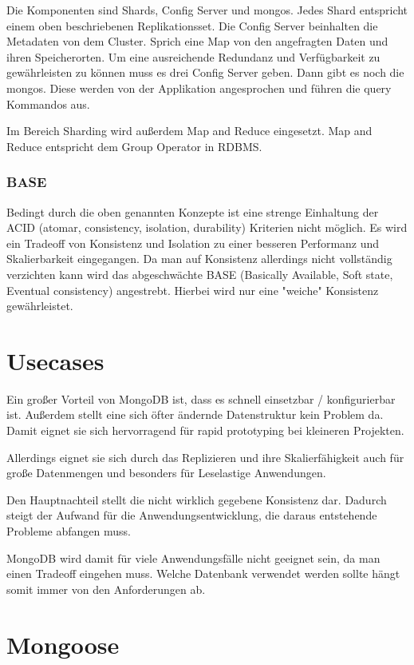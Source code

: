 Die Komponenten sind Shards, Config Server und mongos. Jedes Shard entspricht einem oben
beschriebenen Replikationsset. Die Config Server beinhalten die
Metadaten von dem Cluster. Sprich eine Map von den angefragten Daten und
ihren Speicherorten. Um eine ausreichende Redundanz und Verfügbarkeit zu gewährleisten zu können
muss es drei Config Server geben. Dann gibt es noch die mongos. Diese
werden von der Applikation angesprochen und führen die query Kommandos
aus.

Im Bereich Sharding wird außerdem Map and Reduce eingesetzt. Map and Reduce entspricht dem Group Operator in RDBMS.

\subsubsection{BASE}
Bedingt durch die oben genannten Konzepte ist eine strenge Einhaltung der ACID (atomar, consistency, isolation, durability) Kriterien nicht möglich. Es wird ein Tradeoff von Konsistenz und Isolation zu einer besseren Performanz und Skalierbarkeit eingegangen. Da man auf Konsistenz allerdings nicht vollständig verzichten kann wird das abgeschwächte BASE (Basically Available, Soft state, Eventual consistency) angestrebt. Hierbei wird nur eine "weiche" Konsistenz gewährleistet.

\section{Usecases}\label{usecases}

Ein großer Vorteil von MongoDB ist, dass es schnell einsetzbar / konfigurierbar ist.
Außerdem stellt eine sich öfter ändernde Datenstruktur kein Problem da.
Damit eignet sie sich hervorragend für rapid prototyping bei kleineren Projekten.

Allerdings eignet sie sich durch das Replizieren und ihre Skalierfähigkeit auch für große Datenmengen
und besonders für Leselastige Anwendungen.

Den Hauptnachteil stellt die nicht wirklich gegebene Konsistenz dar.
Dadurch steigt der Aufwand für die Anwendungsentwicklung, die daraus entstehende Probleme abfangen muss.

MongoDB wird damit für viele Anwendungsfälle nicht geeignet sein, da man einen Tradeoff eingehen muss.
Welche Datenbank verwendet werden sollte hängt somit immer von den Anforderungen ab.

\section{Mongoose}\label{mongoose}

